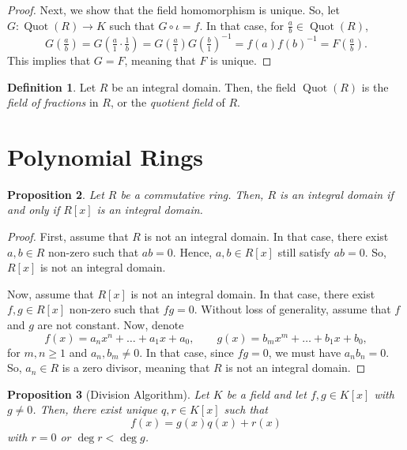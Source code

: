 \documentclass[a4paper, openany]{memoir}
\theoremstyle{definition}
\newtheorem{definition}{Definition}[section]
\theoremstyle{plain}
\newtheorem{proposition}[definition]{Proposition}
\begin{document}
\begin{proof}
        Next, we show that the field homomorphism is unique. So, let $G \colon \operatorname{Quot}(R) \to K$ such that $G \circ \iota = f$. In that case, for $\frac{a}{b} \in \operatorname{Quot}(R)$,
        \[G(\tfrac{a}{b}) = G(\tfrac{a}{1} \cdot \tfrac{1}{b}) = G(\tfrac{a}{1}) G(\tfrac{b}{1})^{-1} = f(a) f(b)^{-1} = F(\tfrac{a}{b}).\]
        This implies that $G = F$, meaning that $F$ is unique.
    \end{proof}

    \begin{definition}
        Let $R$ be an integral domain. Then, the field $\operatorname{Quot}(R)$ is the \emph{field of fractions} in $R$, or the \emph{quotient field} of $R$.
    \end{definition}

    \newpage

    \section{Polynomial Rings}
    \begin{proposition}
        Let $R$ be a commutative ring. Then, $R$ is an integral domain if and only if $R[x]$ is an integral domain.
    \end{proposition}
    \begin{proof}
        First, assume that $R$ is not an integral domain. In that case, there exist $a, b \in R$ non-zero such that $ab = 0$. Hence, $a, b \in R[x]$ still satisfy $ab = 0$. So, $R[x]$ is not an integral domain.

        Now, assume that $R[x]$ is not an integral domain. In that case, there exist $f, g \in R[x]$ non-zero such that $fg = 0$. Without loss of generality, assume that $f$ and $g$ are not constant. Now, denote
        \[f(x) = a_n x^n + \dots + a_1 x + a_0, \qquad g(x) = b_m x^m + \dots + b_1 x + b_0,\]
        for $m, n \geq 1$ and $a_n, b_m \neq 0$. In that case, since $fg = 0$, we must have $a_n b_n = 0$. So, $a_n \in R$ is a zero divisor, meaning that $R$ is not an integral domain.
    \end{proof}

    \begin{proposition}[Division Algorithm]
        Let $K$ be a field and let $f, g \in K[x]$ with $g \neq 0$. Then, there exist unique $q, r \in K[x]$ such that 
        \[f(x) = g(x) q(x) + r(x)\]
        with $r = 0$ or $\deg r < \deg g$.
    \end{proposition}
    
\end{document}
